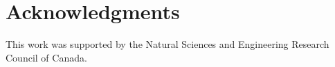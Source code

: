 \section*{Acknowledgments}
This work was supported by the Natural Sciences and Engineering Research Council
of Canada.
